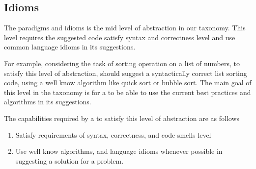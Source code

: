 \subsection{Idioms}
The paradigms and idioms is the mid level of abstraction in our taxonomy. This level requires the suggested code satisfy syntax and correctness level and use common language idioms in its suggestions. 

For example, considering the task of sorting operation on a list of numbers, to satisfy this level of abstraction, \cct{} should suggest a syntactically correct list sorting code, using a well know algorithm like quick sort or bubble sort. The main goal of this level in the taxonomy is for a \cct{} to be able to use the current best practices and algorithms in its suggestions.

The capabilities required by a \cct{} to satisfy this level of abstraction are as follows
\begin{enumerate}
    \item Satisfy requirements of syntax, correctness, and code smells level
    \item Use well know algorithms, and language idioms whenever possible in suggesting a solution for a problem.
\end{enumerate}